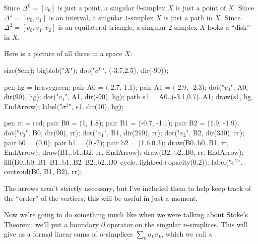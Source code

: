 \begin{example}
	\listhack
	\label{ex:simplex}
	\begin{enumerate}[(a)]
		\ii Since $\Delta^0 = [v_0]$ is just a point,
		a singular $0$-simplex $X$ is just a point of $X$.
		\ii Since $\Delta^1 = [v_0, v_1]$ is an interval,
		a singular $1$-simplex $X$ is just a path in $X$.
		\ii Since $\Delta^2 = [v_0, v_1, v_2]$ is an equilateral triangle,
		a singular $2$-simplex $X$ looks a ``disk'' in $X$.
	\end{enumerate}
	Here is a picture of all three in a space $X$:
	\begin{center}
		\begin{asy}
			size(8cm);
			bigblob("$X$");
			dot("$\sigma^0$", (-3.7,2.5), dir(-90));

			pen hg = heavygreen;
			pair A0 = (-2.7, 1.1);
			pair A1 = (-2.9, -2.3);
			dot("$v_0$", A0, dir(90), hg);
			dot("$v_1$", A1, dir(-90), hg);
			path s1 = A0..(-3.1,0.7)..A1;
			draw(s1, hg, EndArrow);
			label("$\sigma^1$", s1, dir(10), hg);

			pen rr = red;
			pair B0 = (1, 1.8);
			pair B1 = (-0.7, -1.1);
			pair B2 = (1.9, -1.9);
			dot("$v_0$", B0, dir(90), rr);
			dot("$v_1$", B1, dir(210), rr);
			dot("$v_2$", B2, dir(330), rr);
			pair b0 = (0,0);
			pair b1 = (0,-2);
			pair b2 = (1.6,0.3);
			draw(B0..b0..B1, rr, EndArrow);
			draw(B1..b1..B2, rr, EndArrow);
			draw(B2..b2..B0, rr, EndArrow);
			fill(B0..b0..B1--B1..b1..B2--B2..b2..B0--cycle, lightred+opacity(0.2));
			label("$\sigma^2$", centroid(B0, B1, B2), rr);
		\end{asy}
	\end{center}
	The arrows aren't strictly necessary, but I've included them
	to help keep track of the ``order'' of the vertices;
	this will be useful in just a moment.
\end{example}

Now we're going to do something much like when we were talking about Stoke's Theorem:
we'll put a boundary $\partial$ operator on the singular $n$-simplices.
This will give us a formal linear sums of $n$-simplices $\sum_k a_k \sigma_k$,
which we call a .

